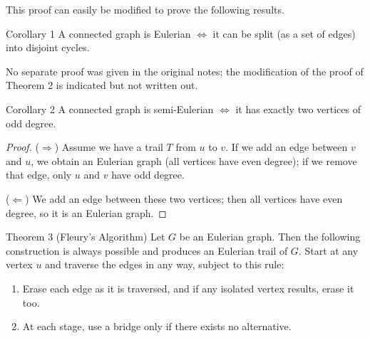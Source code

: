 \medskip
\noindent This proof can easily be modified to prove the following results.

\begin{thmbox}{Corollary 1}
A connected graph is Eulerian $\iff$ it can be split (as a set of edges) into disjoint cycles.
\end{thmbox}

\begin{remark}
No separate proof was given in the original notes; the modification of the proof of Theorem 2 is indicated but not written out.
\end{remark}

\begin{thmbox}{Corollary 2}
A connected graph is semi-Eulerian $\iff$ it has exactly two vertices of odd degree.
\end{thmbox}

\begin{proof}
($\Rightarrow$) Assume we have a trail $T$ from $u$ to $v$. If we add an edge between $v$ and $u$, we obtain an Eulerian graph (all vertices have even degree); if we remove that edge, only $u$ and $v$ have odd degree.

\medskip
\noindent ($\Leftarrow$) We add an edge between these two vertices; then all vertices have even degree, so it is an Eulerian graph.
\end{proof}

\begin{thmbox}{{Theorem 3 (Fleury's Algorithm)}}
Let $G$ be an Eulerian graph. Then the following construction is always possible and produces an Eulerian trail of $G$. Start at any vertex $u$ and traverse the edges in any way, subject to this rule:
\begin{enumerate}
  \item Erase each edge as it is traversed, and if any isolated vertex results, erase it too.
  \item At each stage, use a bridge only if there exists no alternative.
\end{enumerate}
\end{thmbox}


